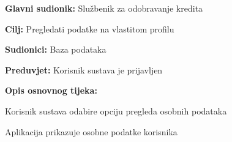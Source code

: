 	            \noindent {}
	            \begin{packed_item}
	            	
	            	\item \textbf{Glavni sudionik: } Službenik za odobravanje kredita
	            	\item  \textbf{Cilj:} Pregledati podatke na vlastitom profilu
	            	\item  \textbf{Sudionici:} Baza podataka
	            	\item  \textbf{Preduvjet:} Korisnik sustava je prijavljen
	            	\item  \textbf{Opis osnovnog tijeka:}
	            	
	            	\item[] \begin{packed_enum}
	            		
	            		\item Korisnik sustava odabire opciju pregleda osobnih podataka
	            		\item Aplikacija prikazuje osobne podatke korisnika
	            		
	            	\end{packed_enum}
	            	
	            \end{packed_item}
        			
